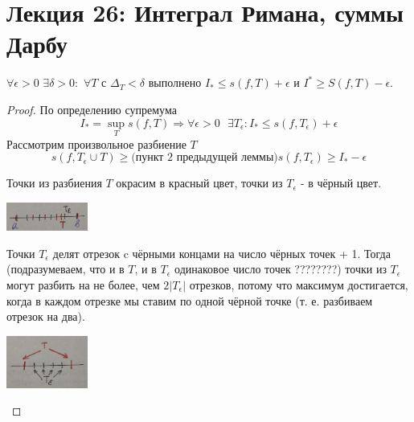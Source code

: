     \newpage
    
    \section{Лекция 26: Интеграл Римана, суммы Дарбу}
    
    \begin{lemma}
    	$\forall \epsilon > 0$ $\exists \delta > 0:$ $\forall T$ с $\Delta_T < \delta$ выполнено $I_{*} \leqslant s(f, T) + \epsilon$ и $I^{*} \geqslant S(f, T) - \epsilon$.
    \end{lemma}
    
    \begin{proof}
    	По определению супремума
    	\[ I_{*} = \sup_T{s(f, T)} \Rightarrow \forall \epsilon > 0 \text{ } \exists T_{\epsilon} : I_{*} \leqslant s(f, T_{\epsilon}) + \epsilon \]
    	Рассмотрим произвольное разбиение $T$
    	\[ s(f, T_{\epsilon} \cup T) \geqslant \text{(пункт 2 предыдущей леммы)} s(f, T_{\epsilon}) \geqslant I_{*} - \epsilon \]
    	
    	Точки из разбиения $T$ окрасим в красный цвет, точки из $T_{\epsilon}$ - в чёрный цвет.
    	
    	\begin{center}
    		\includegraphics[width=0.2\textwidth]{img/lecture26/coloring_segments}
    	\end{center}
    	
    	Точки $T_{\epsilon}$ делят отрезок c чёрными концами на число чёрных точек + 1. Тогда (подразумеваем, что и в $T$, и в $T_{\epsilon}$ одинаковое число точек ????????) точки из $T_{\epsilon}$ могут разбить на не более, чем $2|T_{\epsilon}|$ отрезков, потому что максимум достигается, когда в каждом отрезке мы ставим по одной чёрной точке (т. е. разбиваем отрезок на два).
    	
    	\begin{center}
    		\includegraphics[width=0.2\textwidth]{img/lecture26/segment_number_estimation}
    	\end{center}
    	

\end{proof}
